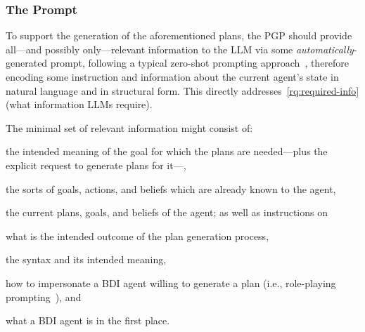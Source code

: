 \documentclass[12pt,a4paper,openright,twoside]{book}
\begin{document}
\subsubsection{The Prompt}


To support the generation of the aforementioned plans, the \ac{PGP} should provide all---and possibly only---relevant information to the \ac{LLM} via some \emph{automatically}-generated prompt, following a typical zero-shot prompting approach~\cite{KojimaGRMI22}, therefore encoding some instruction and information about the current agent's state in natural language and in structural form. This directly addresses~\ref{rq:required-info} (what information LLMs require).

The minimal set of relevant information might consist of:
%
\begin{enumerate*}[label=\textbf{(I\arabic*)}]
    \item\label{item:goal} the intended meaning of the goal  for which the plans are needed---plus the explicit request to generate plans for it---,
    \item\label{item:admissible} the sorts of goals, actions, and beliefs which are already known to the agent,
    \item\label{item:current} the current plans, goals, and beliefs of the agent;
    as well as instructions on
    \item\label{item:pgp} what is the intended outcome of the plan generation process,
    \item\label{item:lang} the \agentspeak{} syntax and its intended meaning,
    \item\label{item:task} how to impersonate a \ac{BDI} agent willing to generate a plan
    (i.e., role-playing prompting~\cite{KongZCLQSSZ23}), and
    \item\label{item:bdi} what a \ac{BDI} agent is in the first place.
\end{enumerate*}
\end{document}
